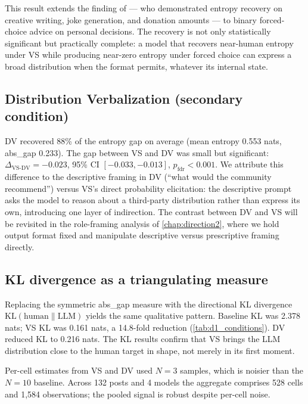 This result extends the finding of \citet{zhang-2025-verbalized-sampling}
— who demonstrated entropy recovery on creative writing, joke generation,
and donation amounts — to binary forced-choice advice on personal
decisions. The recovery is not only statistically significant but
practically complete: a model that recovers near-human entropy under VS
while producing near-zero entropy under forced choice can express a
broad distribution when the format permits, whatever its internal state.

\subsection*{Distribution Verbalization (secondary condition)}

DV recovered 88\% of the entropy gap on average (mean entropy 0.553
nats, abs\_gap 0.233). The gap between VS and DV was small but
significant: $\Delta_{\text{VS-DV}} = -0.023$, 95\% CI $[-0.033,
-0.013]$, $p_{\text{fdr}} < 0.001$. We attribute this difference to the
descriptive framing in DV (``what would the community recommend'') versus
VS's direct probability elicitation: the descriptive prompt asks the
model to reason about a third-party distribution rather than express its
own, introducing one layer of indirection. The contrast between DV and
VS will be revisited in the role-framing analysis of
\cref{chap:direction2}, where we hold output format fixed and manipulate
descriptive versus prescriptive framing directly.

\subsection*{KL divergence as a triangulating measure}

Replacing the symmetric abs\_gap measure with the directional
KL divergence $\text{KL}(\text{human} \| \text{LLM})$ yields
the same qualitative pattern. Baseline KL was 2.378 nats; VS KL
was 0.161 nats, a 14.8-fold reduction (\cref{tab:d1_conditions}).
DV reduced KL to 0.216 nats. The KL results confirm that VS brings
the LLM distribution close to the human target in shape, not merely
in its first moment.

Per-cell estimates from VS and DV used $N{=}3$ samples, which is noisier
than the $N{=}10$ baseline. Across 132 posts and 4 models the aggregate
comprises 528 cells and 1,584 observations; the pooled signal is robust
despite per-cell noise.

